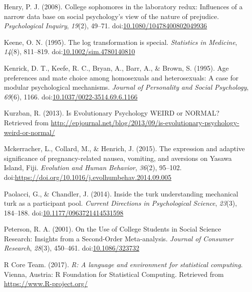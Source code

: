 \documentclass[english,man]{apa6}
\theoremstyle{definition}
\theoremstyle{definition}
\theoremstyle{remark}
\begin{document}
\hypertarget{ref-Henry2008}{}
Henry, P. J. (2008). College sophomores in the laboratory redux:
Influences of a narrow data base on social psychology's view of the
nature of prejudice. \emph{Psychological Inquiry}, \emph{19}(2), 49--71.
doi:\href{https://doi.org/10.1080/10478400802049936}{10.1080/10478400802049936}

\hypertarget{ref-Keene1995}{}
Keene, O. N. (1995). The log transformation is special. \emph{Statistics
in Medicine}, \emph{14}(8), 811--819.
doi:\href{https://doi.org/10.1002/sim.4780140810}{10.1002/sim.4780140810}

\hypertarget{ref-Kenrick1995}{}
Kenrick, D. T., Keefe, R. C., Bryan, A., Barr, A., \& Brown, S. (1995).
Age preferences and mate choice among homosexuals and heterosexuals: A
case for modular psychological mechanisms. \emph{Journal of Personality
and Social Psychology}, \emph{69}(6), 1166.
doi:\href{https://doi.org/10.1037/0022-3514.69.6.1166}{10.1037/0022-3514.69.6.1166}

\hypertarget{ref-Kurzban2013a}{}
Kurzban, R. (2013). Is Evolutionary Psychology WEIRD or NORMAL?
Retrieved from
\url{http://epjournal.net/blog/2013/09/is-evolutionary-psychology-weird-or-normal/}

\hypertarget{ref-Mckerracher2015}{}
Mckerracher, L., Collard, M., \& Henrich, J. (2015). The expression and
adaptive significance of pregnancy-related nausea, vomiting, and
aversions on Yasawa Island, Fiji. \emph{Evolution and Human Behavior},
\emph{36}(2), 95--102.
doi:\href{https://doi.org/https://doi.org/10.1016/j.evolhumbehav.2014.09.005}{https://doi.org/10.1016/j.evolhumbehav.2014.09.005}

\hypertarget{ref-Paolacci2014}{}
Paolacci, G., \& Chandler, J. (2014). Inside the turk understanding
mechanical turk as a participant pool. \emph{Current Directions in
Psychological Science}, \emph{23}(3), 184--188.
doi:\href{https://doi.org/10.1177/0963721414531598}{10.1177/0963721414531598}

\hypertarget{ref-Peterson2001}{}
Peterson, R. A. (2001). On the Use of College Students in Social Science
Research: Insights from a Second-Order Meta-analysis. \emph{Journal of
Consumer Research}, \emph{28}(3), 450--461.
doi:\href{https://doi.org/10.1086/323732}{10.1086/323732}

\hypertarget{ref-R-base}{}
R Core Team. (2017). \emph{R: A language and environment for statistical
computing}. Vienna, Austria: R Foundation for Statistical Computing.
Retrieved from \url{https://www.R-project.org/}
\end{document}
